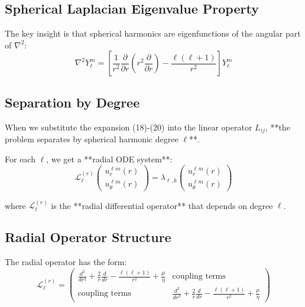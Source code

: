 \documentclass{article}
\begin{document}
\subsection{Spherical Laplacian Eigenvalue Property}

The key insight is that spherical harmonics are eigenfunctions of the angular part of $\nabla^2$:
\begin{equation}
\nabla^2 Y_\ell^m = \left[\frac{1}{r^2}\frac{\partial}{\partial r}\left(r^2\frac{\partial}{\partial r}\right) - \frac{\ell(\ell+1)}{r^2}\right] Y_\ell^m
\end{equation}

\subsection{Separation by Degree}

When we substitute the expansion (18)-(20) into the linear operator $L_{ij}$, **the problem separates by spherical harmonic degree $\ell$**.

For each $\ell$, we get a **radial ODE system**:
\begin{equation}
\mathcal{L}_\ell^{(r)} \begin{pmatrix} u_r^{\ell m}(r) \\ u_\theta^{\ell m}(r) \end{pmatrix} = \lambda_{\ell,k} \begin{pmatrix} u_r^{\ell m}(r) \\ u_\theta^{\ell m}(r) \end{pmatrix}
\end{equation}

where $\mathcal{L}_\ell^{(r)}$ is the **radial differential operator** that depends on degree $\ell$.

\subsection{Radial Operator Structure}

The radial operator has the form:
\begin{equation}
\mathcal{L}_\ell^{(r)} = \begin{pmatrix}
\frac{d^2}{dr^2} + \frac{2}{r}\frac{d}{dr} - \frac{\ell(\ell+1)}{r^2} + \frac{\mu}{\eta} & \text{coupling terms} \\
\text{coupling terms} & \frac{d^2}{dr^2} + \frac{2}{r}\frac{d}{dr} - \frac{\ell(\ell+1)}{r^2} + \frac{\mu}{\eta}
\end{pmatrix}
\end{equation}
\end{document}
